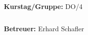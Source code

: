 \documentclass[12pt,a4paper]{article}
\begin{document}
\begin{verbatim}


\end{verbatim}
			\begin{flushleft}
			\textbf{\Large{Kurstag/Gruppe:}} \Large{DO/4}
			\end{flushleft}

\begin{verbatim}

\end{verbatim}
			\begin{flushleft}
			\LARGE{\textbf{Betreuer:}}	\Large{Erhard Schafler}	
			\end{flushleft}

\pagebreak
\setlength{\columnsep}{20pt}
\end{document}
